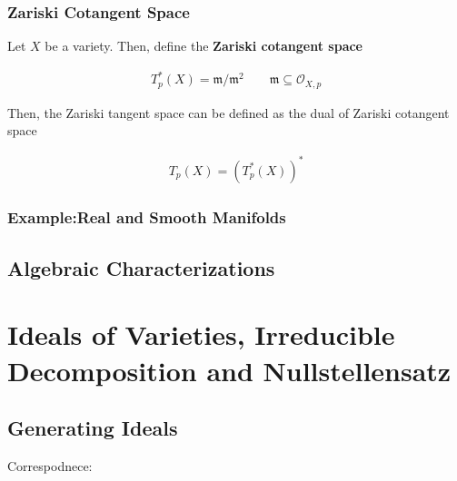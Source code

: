\documentclass[Total.tex]{subfiles}
\begin{document}
					\subsubsection{Zariski Cotangent Space}
					
						\begin{Def}
							Let $X$ be a variety. Then, define the \textbf{Zariski cotangent space}
							
							\begin{gather*}
								T^*_p(X)=\mathfrak{m}/\mathfrak{m}^2\qquad \mathfrak{m}\subseteq \mathcal{O}_{X,p}
							\end{gather*}
							
							Then, the Zariski tangent space can be defined as the dual of Zariski cotangent space
							
							\begin{gather*}
								T_p(X)=(T_p^*(X))^*
							\end{gather*}
						\end{Def}
					
					
					\subsubsection{Example:Real and Smooth Manifolds}
					
					
			
			\subsection{Algebraic Characterizations}
			
			
		\section{Ideals of Varieties, Irreducible Decomposition and Nullstellensatz}
		
		\subsection{Generating Ideals}
		
		Correspodnece:
		
		\begin{center}
		\end{center}
		
\end{document}
